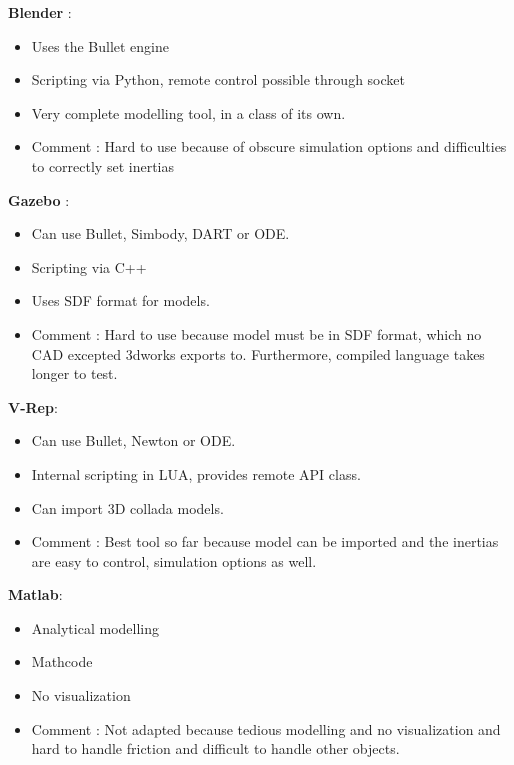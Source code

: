 \textbf{Blender\cite{Bruyninckx04}
} : \begin{itemize}
\item Uses the Bullet engine
\item Scripting via Python, remote control possible through socket
\item Very complete modelling tool, in a class of its own.
\item Comment : Hard to use because of obscure simulation options and difficulties to correctly set inertias
\end{itemize}

\textbf{Gazebo} : \begin{itemize}
\item Can use Bullet, Simbody, DART or ODE.
\item Scripting via C++
\item Uses SDF format for models.
\item Comment : Hard to use because model must be in SDF format, which no CAD excepted 3dworks exports to. Furthermore, compiled language takes longer to test.
\end{itemize}

\textbf{V-Rep}: \begin{itemize}
\item Can use Bullet, Newton or ODE.
\item Internal scripting in LUA, provides remote API class.
\item Can import 3D collada models.
\item Comment : Best tool so far because model can be imported and the inertias are easy to control, simulation options as well.
\end{itemize}

\textbf{Matlab}: \begin{itemize}
\item Analytical modelling
\item Mathcode
\item No visualization
\item Comment : Not adapted because tedious modelling and no visualization and hard to handle friction and difficult to handle other objects.
\end{itemize}

